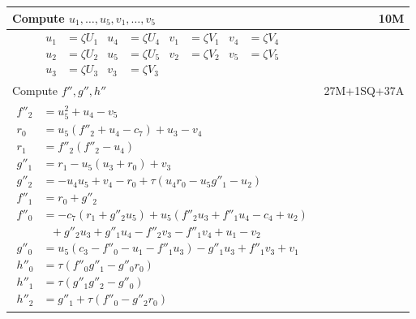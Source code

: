 \pagebreak
\begin{tabularx}{\linewidth}{|Xr|}
  \hline
    Compute $u_1, \ldots, u_5, v_1, \ldots, v_5$ & 10M \\
  \hline
  {\begin{align*}
    u_1 &= \zeta U_1 & u_4 &= \zeta U_4 & v_1 &= \zeta V_1 & v_4 &= \zeta V_4 \\
    u_2 &= \zeta U_2 & u_5 &= \zeta U_5 & v_2 &= \zeta V_2 & v_5 &= \zeta V_5 \\
    u_3 &= \zeta U_3                    & v_3 &= \zeta V_3
  \end{align*}} & \\
  \hline
    Compute $f'', g'', h''$ & 27M+1SQ+37A \\
  \hline
  {\begin{align*}
    f''_2 &= u_5^2 + u_4 - v_5 \\
    r_0   &= u_5(f''_2 + u_4 - c_7) + u_3 - v_4 \\
    r_1   &= f''_2(f''_2 - u_4) \\
    g''_1 &= r_1 - u_5(u_3 + r_0) + v_3 \\
    g''_2 &= -u_4u_5 + v_4 - r_0 + \tau(u_4r_0 - u_5g''_1 - u_2) \\
    f''_1 &= r_0 + g''_2 \\
    f''_0 &= -c_7(r_1 + g''_2u_5) + u_5(f''_2u_3 + f''_1u_4 - c_4 + u_2) \\
          &~~~ + g''_2u_3 + g''_1u_4 - f''_2v_3 - f''_1v_4 + u_1 - v_2 \\
    g''_0 &= u_5(c_3 - f''_0 - u_1 - f''_1u_3) - g''_1u_3 + f''_1v_3 + v_1 \\
    h''_0 &= \tau(f''_0g''_1 - g''_0r_0) \\
    h''_1 &= \tau(g''_1g''_2 - g''_0) \\
    h''_2 &= g''_1 + \tau(f''_0 - g''_2r_0)
  \end{align*}} & \\
  \hline
\end{tabularx}

\setlength{\abovedisplayskip}{\tempabovedisplayskip}
\setlength{\belowdisplayskip}{\tempbelowdisplayskip}

